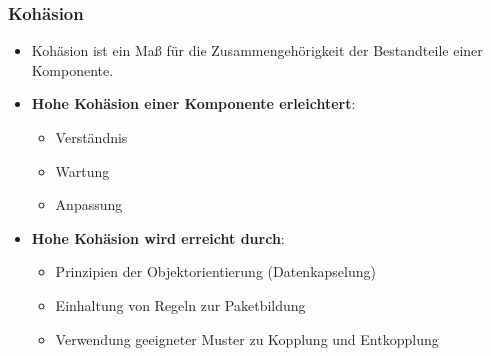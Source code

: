 \documentclass[11pt, a4paper]{article}
\begin{document}
\subsubsection{Kohäsion}
\begin{itemize}
    \item Kohäsion ist ein Maß für die Zusammengehörigkeit der Bestandteile einer Komponente.
    \item \textbf{Hohe Kohäsion einer Komponente erleichtert}:
    \begin{itemize}
        \item Verständnis
        \item Wartung
        \item Anpassung
    \end{itemize}
    \item \textbf{Hohe Kohäsion wird erreicht durch}:
    \begin{itemize}
        \item Prinzipien der Objektorientierung (Datenkapselung)
        \item Einhaltung von Regeln zur Paketbildung
        \item Verwendung geeigneter Muster zu Kopplung und Entkopplung
    \end{itemize}
\end{itemize}

\newpage
\end{document}
